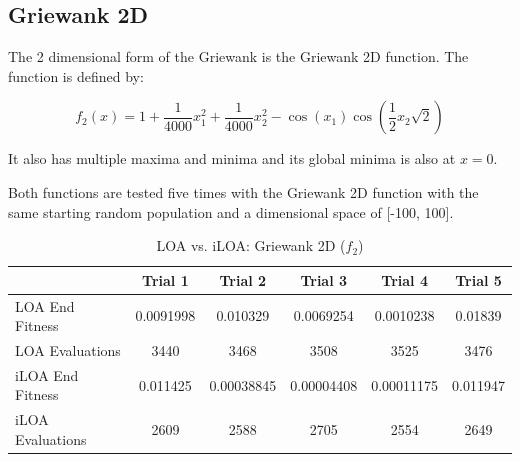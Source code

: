 \subsection{Griewank 2D}

\par The 2 dimensional form of the Griewank is the Griewank 2D function. The function is defined by:

$$
f_2(x) = 1+\frac {1}{4000} x_1^2 + \frac {1}{4000} x_2^2- \cos(x_1) \cos \left( \frac 1 2 x_2\sqrt {2} \right)
$$

It also has multiple maxima and minima and its global minima is also at $x=0$.

\par Both functions are tested five times with the Griewank 2D function with the same starting random population and a dimensional space of [-100, 100].

\begin{table}[ht]
\scriptsize
\begin{tabular}{l|ccccc}
\textbf{}        & \textbf{Trial 1} & \textbf{Trial 2} & \textbf{Trial 3} & \textbf{Trial 4} & \textbf{Trial 5} \\
\hline
LOA End Fitness  & 0.0091998        & 0.010329         & 0.0069254        & 0.0010238        & 0.01839          \\
LOA Evaluations  & 3440             & 3468             & 3508             & 3525             & 3476             \\
iLOA End Fitness & 0.011425         & 0.00038845       & 0.00004408       & 0.00011175       & 0.011947         \\
iLOA Evaluations & 2609             & 2588             & 2705             & 2554             & 2649
\end{tabular}
\caption{ \scriptsize LOA vs. iLOA: Griewank 2D ($f_2$)}
\end{table}


